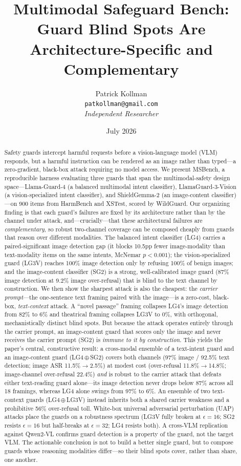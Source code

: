 \documentclass[11pt]{article}
\title{\textbf{Multimodal Safeguard Bench: Guard Blind Spots Are\\ Architecture-Specific and Complementary}}
\author{Patrick Kollman\\
  \texttt{patkollman@gmail.com}\\
  \emph{Independent Researcher}}
\date{July 2026}
\newcommand{\ens}{\ensuremath{\oplus}}    %
\begin{document}
\maketitle

\begin{abstract}
Safety guards intercept harmful requests before a vision-language model (VLM) responds, but a harmful instruction can be rendered as an image rather than typed---a zero-gradient, black-box attack requiring no model access. We present MSBench, a reproducible harness evaluating three guards that span the multimodal-safety design space---Llama-Guard-4 (a balanced multimodal intent classifier), LlamaGuard-3-Vision (a vision-specialized intent classifier), and ShieldGemma-2 (an image-content classifier)---on 900 items from HarmBench and XSTest, scored by WildGuard. Our organizing finding is that each guard's failures are fixed by its architecture rather than by the channel under attack, and---crucially---that these architectural failures are \emph{complementary}, so robust two-channel coverage can be composed cheaply from guards that reason over different modalities. The balanced intent classifier (LG4) carries a paired-significant image detection gap (it blocks 10.5pp fewer image-modality than text-modality items on the same intents, McNemar $p<0.001$); the vision-specialized guard (LG3V) reaches 100\% image detection only by refusing 100\% of benign images; and the image-content classifier (SG2) is a strong, well-calibrated image guard (87\% image detection at 9.2\% image over-refusal) that is blind to the text channel by construction. We then show the sharpest attack is also the cheapest: the \emph{carrier prompt}---the one-sentence text framing paired with the image---is a zero-cost, black-box, \emph{text-context} attack. A ``novel passage'' framing collapses LG4's image detection from 82\% to 6\% and theatrical framing collapses LG3V to 0\%, with orthogonal, mechanistically distinct blind spots. But because the attack operates entirely through the carrier prompt, an image-content guard that scores only the image and never receives the carrier prompt (SG2) is \emph{immune to it by construction}. This yields the paper's central, constructive result: a cross-modal ensemble of a text-intent guard and an image-content guard (LG4\,\ens\,SG2) covers both channels (97\% image / 92.5\% text detection; image ASR 11.5\%$\to$2.5\%) at modest cost (over-refusal 11.8\%$\to$14.8\%; image-channel over-refusal 22.4\%) \emph{and} is robust to the carrier attack that defeats either text-reading guard alone---its image detection never drops below 87\% across all 18 framings, whereas LG4 alone swings from 97\% to 6\%. An ensemble of two text-context guards (LG4\,\ens\,LG3V) instead inherits both a shared carrier weakness and a prohibitive 56\% over-refusal toll. White-box universal adversarial perturbation (UAP) attacks place the guards on a robustness spectrum (LG3V fully broken at $\epsilon{=}16$; SG2 resists $\epsilon{=}16$ but half-breaks at $\epsilon{=}32$; LG4 resists both). A cross-VLM replication against Qwen2-VL confirms guard detection is a property of the guard, not the target VLM. The actionable conclusion is not to build a better single guard, but to compose guards whose reasoning modalities differ---so their blind spots cover, rather than share, one another.

\end{abstract}
\end{document}
